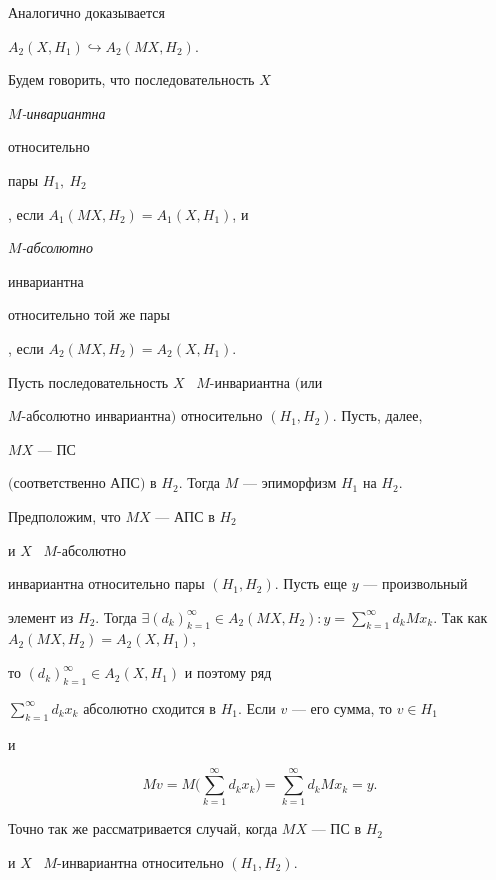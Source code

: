 Аналогично доказывается








\begin{prop}


$A_2(X,H_1) \hookrightarrow A_2(MX,H_2)$.


\end{prop}





Будем говорить, что последовательность $X$ \ {\it $M$-инвариантна


относительно


пары $H_1,\ H_2$}, если $A_1(MX,H_2)=A_1(X,H_1)$, и {\it $M$-абсолютно


инвариантна


относительно той же пары}, если $A_2(MX,H_2)=A_2(X,H_1)$.








\begin{prop}


Пусть последовательность $X$ \ $M$-инвариантна $($или


$M$-абсолютно инвариантна\/$)$ относительно $(H_1,H_2)$. Пусть, далее,


$MX$ --- ПС


$($соответственно АПС\/$)$ в $H_2$. Тогда $M$ --- эпиморфизм $H_1$ на $H_2$.


\end{prop}








\begin{pf}


Предположим, что $MX$ --- АПС в $H_2$


и $X$ \ $M$-абсолютно


инвариантна относительно пары $(H_1,H_2)$. Пусть еще $y$ --- произвольный


элемент из $H_2$. Тогда $\exists(d_k)^{\infty}_{k=1}\in A_2(MX,H_2):


y=\sum\limits_{k=1}^{\infty}d_kMx_k$. Так как $A_2(MX,H_2)=A_2(X,H_1)$,


то $(d_k)_{k=1}^{\infty}\in A_2(X,H_1)$ и поэтому ряд


$\sum\limits_{k=1}^{\infty}


d_kx_k$ абсолютно сходится в $H_1$. Если $v$ --- его сумма, то $v\in H_1$


и


$$


Mv=M\bigg(\sum_{k=1}^{\infty}d_kx_k\bigg)=\sum_{k=1}^{\infty}d_kMx_k=y.


$$


Точно так же рассматривается случай, когда $MX$ --- ПС в $H_2$


и $X$ \ $M$-инвариантна относительно $(H_1,H_2)$.


\end{pf}





